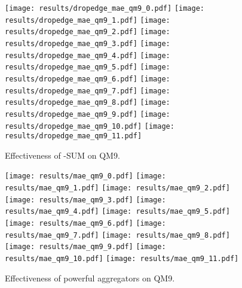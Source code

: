 \documentclass{article} \usepackage{iclr2021_conference,times}
\begin{document}
\begin{figure}[h]
\centering
\texttt{[image: results/dropedge\_mae\_qm9\_0.pdf]}
\texttt{[image: results/dropedge\_mae\_qm9\_1.pdf]}
\texttt{[image: results/dropedge\_mae\_qm9\_2.pdf]}
\texttt{[image: results/dropedge\_mae\_qm9\_3.pdf]}
\texttt{[image: results/dropedge\_mae\_qm9\_4.pdf]}
\texttt{[image: results/dropedge\_mae\_qm9\_5.pdf]}
\texttt{[image: results/dropedge\_mae\_qm9\_6.pdf]}
\texttt{[image: results/dropedge\_mae\_qm9\_7.pdf]}
\texttt{[image: results/dropedge\_mae\_qm9\_8.pdf]}
\texttt{[image: results/dropedge\_mae\_qm9\_9.pdf]}
\texttt{[image: results/dropedge\_mae\_qm9\_10.pdf]}
\texttt{[image: results/dropedge\_mae\_qm9\_11.pdf]}
\caption{Effectiveness of -SUM on QM9.}
\label{qm9-plot-1}
\end{figure}

\begin{figure}[h]
\centering
\texttt{[image: results/mae\_qm9\_0.pdf]}
\texttt{[image: results/mae\_qm9\_1.pdf]}
\texttt{[image: results/mae\_qm9\_2.pdf]}
\texttt{[image: results/mae\_qm9\_3.pdf]}
\texttt{[image: results/mae\_qm9\_4.pdf]}
\texttt{[image: results/mae\_qm9\_5.pdf]}
\texttt{[image: results/mae\_qm9\_6.pdf]}
\texttt{[image: results/mae\_qm9\_7.pdf]}
\texttt{[image: results/mae\_qm9\_8.pdf]}
\texttt{[image: results/mae\_qm9\_9.pdf]}
\texttt{[image: results/mae\_qm9\_10.pdf]}
\texttt{[image: results/mae\_qm9\_11.pdf]}
\caption{Effectiveness of powerful aggregators on QM9.}
\label{qm9-plot-2}
\end{figure}
\end{document}
